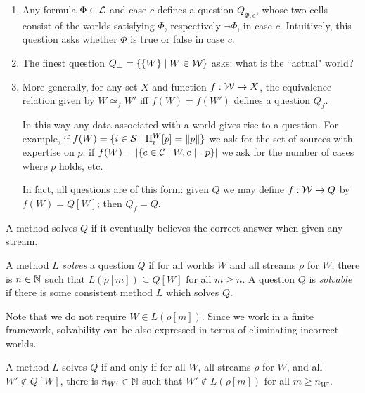 \begin{example}\leavevmode
    \label{ex_questions}
    \begin{enumerate}
        \item Any formula $\Phi \in \mathcal{L}$ and case $c$ defines a question
              $Q_{\Phi, c}$, whose two cells consist of the worlds satisfying
              $\Phi$, respectively $\neg\Phi$, in case $c$. Intuitively, this
              question asks whether $\Phi$ is true or false in case $c$.
        \item The finest question $Q_\bot = \{\{W\} \mid W \in \mathcal{W}\}$ asks:
              what is the ``actual" world?
        \item More generally, for any set $X$ and function $f: \mathcal{W} \to X$,
              the equivalence relation given by $W \simeq_f W'$ iff $f(W) =
              f(W')$ defines a question $Q_f$.

              In this way any data associated with a world gives rise to a
              question. For example, if $f(W) = \{i \in \mathcal{S} \mid \Pi^W_i[p]
              = \|{p}\|\}$ we ask for the set of sources with expertise
              on $p$; if $f(W) = |\{c \in \mathcal{C} \mid W, c \models p\}|$ we
              ask for the number of cases where $p$ holds, etc.

              In fact, all questions are of this form: given $Q$ we may define $f:
              \mathcal{W} \to Q$ by $f(W) = Q[W]$; then $Q_f = Q$.
    \end{enumerate}
\end{example}

A method solves $Q$ if it eventually believes the correct answer when given any
stream.

\begin{definition}
    \label{def_solvability}
    A method $L$ \emph{solves} a question $Q$ if for all worlds $W$ and all
    streams $\rho$ for $W$, there is $n \in \mathbb{N}$ such that $L(\rho[m]) \subseteq
    Q[W]$ for all $m \ge n$. A question $Q$ is \emph{solvable} if there is some
    consistent method $L$ which solves $Q$.
\end{definition}

Note that we do not require $W \in L(\rho[m])$.
%
Since we work in a finite framework, solvability can be also expressed
in terms of eliminating incorrect worlds.

\begin{proposition}
    \label{prop_elimination_solving}
    A method $L$ solves $Q$ if and only if for all $W$, all streams $\rho$ for
    $W$, and all $W' \notin Q[W]$, there is $n_{W'} \in \mathbb{N}$ such that $W'
    \notin L(\rho[m])$ for all $m \ge n_{W'}$.
\end{proposition}

